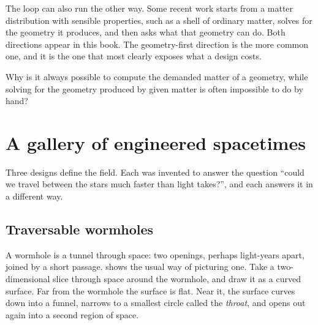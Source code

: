 The loop can also run the other way. Some recent work starts from a matter
distribution with sensible properties, such as a shell of ordinary matter,
solves for the geometry it produces, and then asks what that geometry can do.
Both directions appear in this book. The geometry-first direction is the more
common one, and it is the one that most clearly exposes what a design costs.

\begin{checkpoint}
Why is it always possible to compute the demanded matter of a geometry, while
solving for the geometry produced by given matter is often impossible to do by
hand?
\end{checkpoint}

\section{A gallery of engineered spacetimes}\label{sec:gallery}

Three designs define the field. Each was invented to answer the question
\enquote{could we travel between the stars much faster than light takes?}, and
each answers it in a different way.

\subsection{Traversable wormholes}

A wormhole is a tunnel through space: two openings, perhaps light-years apart,
joined by a short passage.  shows the usual way of picturing
one. Take a two-dimensional slice through space around the wormhole, and draw
it as a curved surface. Far from the wormhole the surface is flat. Near it, the
surface curves down into a funnel, narrows to a smallest circle called the
\emph{throat}, and opens out again into a second region of space.

